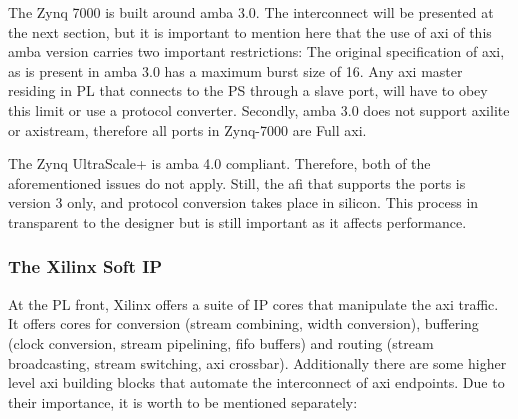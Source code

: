 The Zynq 7000 is built around \gls{amba} 3.0.
The interconnect will be presented at the next section,
but it is important to mention here that
the use of \gls{axi} of this \gls{amba} version
carries two important restrictions:
The original specification of \gls{axi},
as is present in \gls{amba} 3.0 has a maximum \gls{burst} size of 16.
Any \gls{axi} master residing in PL that connects to the PS through a slave port,
will have to obey this limit or use a protocol converter.
Secondly, \gls{amba} 3.0 does not support \gls{axilite} or \gls{axistream},
therefore all ports in Zynq-7000 are Full \gls{axi}.

The Zynq UltraScale+ is \gls{amba} 4.0 compliant.
Therefore, both of the aforementioned issues do not apply.
Still, the \gls{afi} that supports the  ports is version 3 only,
and protocol conversion takes place in silicon.
This process in transparent to the designer but is still important
as it affects performance.

\subsubsection{The Xilinx Soft IP}
\label{sect:xilinx-ip}

At the PL front, Xilinx offers a suite of
IP cores that manipulate the \gls{axi} traffic.
It offers cores for conversion (stream combining,
width conversion), buffering (clock conversion,
stream pipelining, \gls{fifo} buffers) and routing
(stream broadcasting, stream switching, \gls{axi} crossbar).
Additionally there are some higher level \gls{axi} building blocks
that automate the interconnect of \gls{axi} endpoints.
Due to their importance, it is worth to be mentioned separately:

